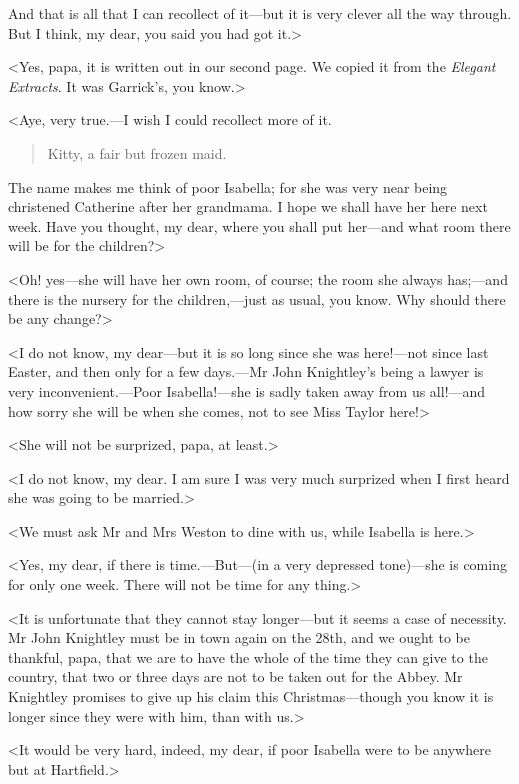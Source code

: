 And that is all that I can recollect of it—but it is very clever all the way through. But I think, my dear, you said you had got it.>

<Yes, papa, it is written out in our second page. We copied it from the \textit{Elegant Extracts}. It was Garrick's, you know.>

<Aye, very true.—I wish I could recollect more of it.

\begin{quote}
Kitty, a fair but frozen maid.
\end{quote}

The name makes me think of poor Isabella; for she was very near being christened Catherine after her grandmama. I hope we shall have her here next week. Have you thought, my dear, where you shall put her—and what room there will be for the children?>

<Oh! yes—she will have her own room, of course; the room she always has;—and there is the nursery for the children,—just as usual, you know. Why should there be any change?>

<I do not know, my dear—but it is so long since she was here!—not since last Easter, and then only for a few days.—Mr John Knightley's being a lawyer is very inconvenient.—Poor Isabella!—she is sadly taken away from us all!—and how sorry she will be when she comes, not to see Miss Taylor here!>

<She will not be surprized, papa, at least.>

<I do not know, my dear. I am sure I was very much surprized when I first heard she was going to be married.>

<We must ask Mr and Mrs Weston to dine with us, while Isabella is here.>

<Yes, my dear, if there is time.—But—(in a very depressed tone)—she is coming for only one week. There will not be time for any thing.>

<It is unfortunate that they cannot stay longer—but it seems a case of necessity. Mr John Knightley must be in town again on the 28th, and we ought to be thankful, papa, that we are to have the whole of the time they can give to the country, that two or three days are not to be taken out for the Abbey. Mr Knightley promises to give up his claim this Christmas—though you know it is longer since they were with him, than with us.>

<It would be very hard, indeed, my dear, if poor Isabella were to be anywhere but at Hartfield.>

